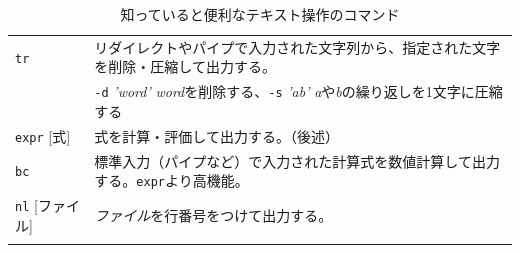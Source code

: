 \documentclass[a4j]{ltjreport}
\begin{document}
\begin{longtable}[c]{|p{3.5cm}|p{13.5cm}|}
        \hline
        \texttt{tr} &リダイレクトやパイプで入力された文字列から、指定された文字を削除・圧縮して出力する。\\
        &\texttt{-d} \textit{'word'} \textit{word}を削除する、\texttt{-s} \textit{'ab'} \textit{a}や\textit{b}の繰り返しを1文字に圧縮する\\
        \hline
        \texttt{expr} [式]&式を計算・評価して出力する。（後述）\\ 
        \hline
        \texttt{bc} &標準入力（パイプなど）で入力された計算式を数値計算して出力する。\texttt{expr}より高機能。\\ 
        \hline
        \texttt{nl} [ファイル]&\emph{ファイル}を行番号をつけて出力する。\\
        \hline

        \caption{知っていると便利なテキスト操作のコマンド}
    \end{longtable}
\end{document}

